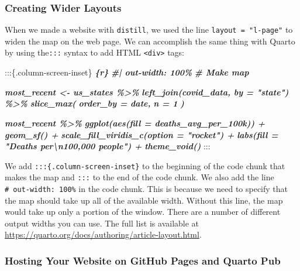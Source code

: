 \documentclass[
]{book}
\newenvironment{Shaded}{\begin{snugshade}}{\end{snugshade}}
\newcommand{\InformationTok}[1]{\textcolor[rgb]{0.56,0.35,0.01}{\textbf{\textit{#1}}}}
\newcommand{\NormalTok}[1]{#1}
\begin{document}
\hypertarget{creating-wider-layouts}{%
\subsubsection*{Creating Wider Layouts}\label{creating-wider-layouts}}

When we made a website with \texttt{distill}, we used the line \texttt{layout\ =\ "l-page"} to widen the map on the web page. We can accomplish the same thing with Quarto by using the\texttt{:::} syntax to add HTML \texttt{\textless{}div\textgreater{}} tags:

\begin{Shaded}
\begin{Highlighting}[]
\NormalTok{:::\{.column{-}screen{-}inset\}}
\InformationTok{\textasciigrave{}\textasciigrave{}\textasciigrave{}\{r\}}
\InformationTok{\#| out{-}width: 100\%}
\InformationTok{\# Make map}

\InformationTok{most\_recent \textless{}{-} us\_states \%\textgreater{}\%}
\InformationTok{  left\_join(covid\_data, by = "state") \%\textgreater{}\%}
\InformationTok{  slice\_max(}
\InformationTok{    order\_by = date,}
\InformationTok{    n = 1}
\InformationTok{  )}

\InformationTok{most\_recent \%\textgreater{}\%}
\InformationTok{  ggplot(aes(fill = deaths\_avg\_per\_100k)) +}
\InformationTok{  geom\_sf() +}
\InformationTok{  scale\_fill\_viridis\_c(option = "rocket") +}
\InformationTok{  labs(fill = "Deaths per\textbackslash{}n100,000 people") +}
\InformationTok{  theme\_void()}
\InformationTok{\textasciigrave{}\textasciigrave{}\textasciigrave{}}
\NormalTok{:::}
\end{Highlighting}
\end{Shaded}

We add \texttt{:::\{.column-screen-inset\}} to the beginning of the code chunk that makes the map and \texttt{:::} to the end of the code chunk. We also add the line \texttt{\#\textbar{}\ out-width:\ 100\%} in the code chunk. This is because we need to specify that the map should take up all of the available width. Without this line, the map would take up only a portion of the window. There are a number of different output widths you can use. The full list is available at \url{https://quarto.org/docs/authoring/article-layout.html}.

\hypertarget{hosting-your-website-on-github-pages-and-quarto-pub}{%
\subsubsection*{Hosting Your Website on GitHub Pages and Quarto Pub}\label{hosting-your-website-on-github-pages-and-quarto-pub}}
\end{document}
